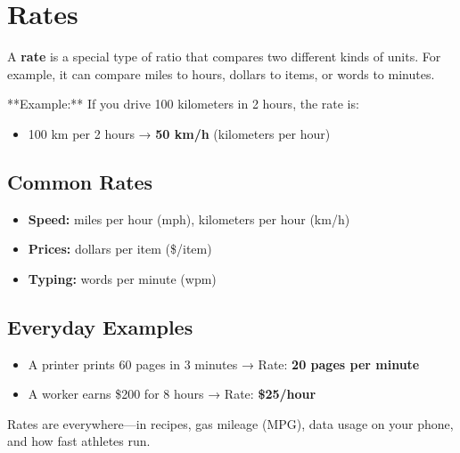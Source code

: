 \cleardoublepage
\section{Rates}

A \textbf{rate} is a special type of ratio that compares two different kinds of units. For example, it can compare miles to hours, dollars to items, or words to minutes.

**Example:**  
If you drive 100 kilometers in 2 hours, the rate is:
\begin{itemize}
  \item 100 km per 2 hours → \textbf{50 km/h} (kilometers per hour)
\end{itemize}

\subsection*{Common Rates}

\begin{itemize}
  \item \textbf{Speed:} miles per hour (mph), kilometers per hour (km/h)
  \item \textbf{Prices:} dollars per item (\$/item)
  \item \textbf{Typing:} words per minute (wpm)
\end{itemize}

\subsection*{Everyday Examples}

\begin{itemize}
  \item A printer prints 60 pages in 3 minutes → Rate: \textbf{20 pages per minute}
  \item A worker earns \$200 for 8 hours → Rate: \textbf{\$25/hour}
\end{itemize}

Rates are everywhere—in recipes, gas mileage (MPG), data usage on your phone, and how fast athletes run.





